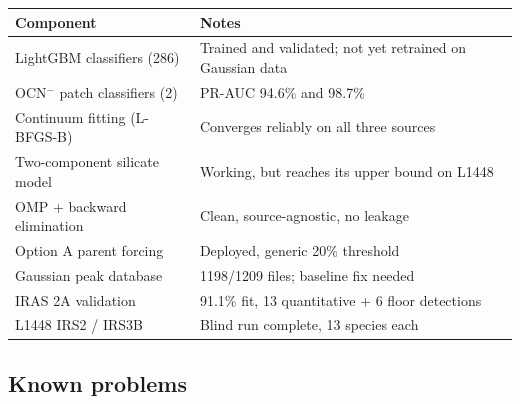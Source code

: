\documentclass[11pt,a4paper]{article}
\newcommand{\ocn}{OCN$^-$}
\begin{document}
\begin{table}[H]
\centering
\small
\begin{tabular}{@{}L{5.2cm}L{9.6cm}@{}}
\toprule
\textbf{Component} & \textbf{Notes} \\
\midrule
LightGBM classifiers (286) & Trained and validated; not yet retrained on
Gaussian data \\
\ocn{} patch classifiers (2) & PR-AUC 94.6\% and 98.7\% \\
Continuum fitting (L-BFGS-B) & Converges reliably on all three sources \\
Two-component silicate model & Working, but reaches its upper bound on
L1448 \\
OMP + backward elimination & Clean, source-agnostic, no leakage \\
Option A parent forcing & Deployed, generic 20\% threshold \\
Gaussian peak database & 1198/1209 files; baseline fix needed \\
IRAS 2A validation & 91.1\% fit, 13 quantitative + 6 floor detections \\
L1448 IRS2 / IRS3B & Blind run complete, 13 species each \\
\bottomrule
\end{tabular}
\end{table}

\subsection{Known problems}
\end{document}
